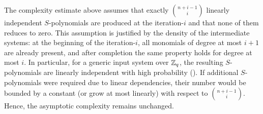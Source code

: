 


\begin{remark}
The complexity estimate above assumes that exactly $\binom{n+i-1}{i}$ linearly independent $S$-polynomials are produced at the iteration-$i$ and that none of them reduces to zero.
This assumption is justified by the density of the intermediate systems:
at the beginning of the iteration-$i$, all monomials of degree at most $i+1$ are already present, and after completion the same property holds for degree at most $i$.
In particular, for a generic input system over $\mathbb{Z}_q$, the resulting $S$-polynomials are linearly independent with high probability ().
If additional $S$-polynomials were required due to linear dependencies, their number would be bounded by a constant (or grow at most linearly) with respect to $\binom{n+i-1}{i}$.
Hence, the asymptotic complexity remains unchanged.
\end{remark}






